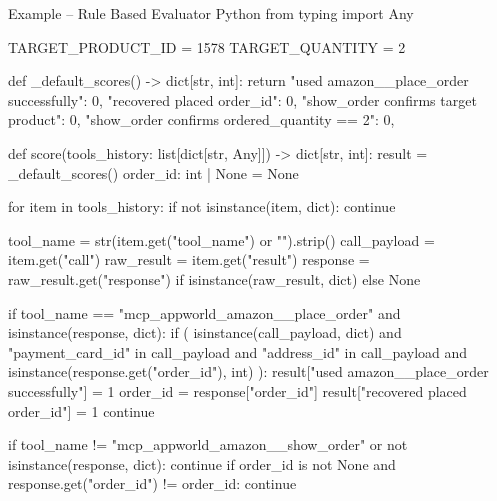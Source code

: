 
\newcommand{\tcolorboxPromptExampleRuleBasedEvaluatorTitleText}{}
\newcommand{\tcolorboxPromptExampleRuleBasedEvaluatorCommonText}{}
\newcommand{\tcolorboxPromptExampleRuleBasedEvaluatorTitleBeforeVspace}{}
\newcommand{\tcolorboxPromptExampleRuleBasedEvaluatorCommonTextLineSkip}{}

\begin{tcbCodeListing}{Example -- Rule Based Evaluator
}{Python}
from typing import Any

TARGET_PRODUCT_ID = 1578
TARGET_QUANTITY = 2


def _default_scores() -> dict[str, int]:
    return {
        "used amazon__place_order successfully": 0,
        "recovered placed order_id": 0,
        "show_order confirms target product": 0,
        "show_order confirms ordered_quantity == 2": 0,
    }


def score(tools_history: list[dict[str, Any]]) -> dict[str, int]:
    result = _default_scores()
    order_id: int | None = None

    for item in tools_history:
        if not isinstance(item, dict):
            continue

        tool_name = str(item.get("tool_name") or "").strip()
        call_payload = item.get("call")
        raw_result = item.get("result")
        response = raw_result.get("response") if isinstance(raw_result, dict) else None

        if tool_name == "mcp_appworld_amazon__place_order" and isinstance(response, dict):
            if (
                isinstance(call_payload, dict)
                and "payment_card_id" in call_payload
                and "address_id" in call_payload
                and isinstance(response.get("order_id"), int)
            ):
                result["used amazon__place_order successfully"] = 1
                order_id = response["order_id"]
                result["recovered placed order_id"] = 1
            continue

        if tool_name != "mcp_appworld_amazon__show_order" or not isinstance(response, dict):
            continue
        if order_id is not None and response.get("order_id") != order_id:
            continue


\end{tcbCodeListing}
